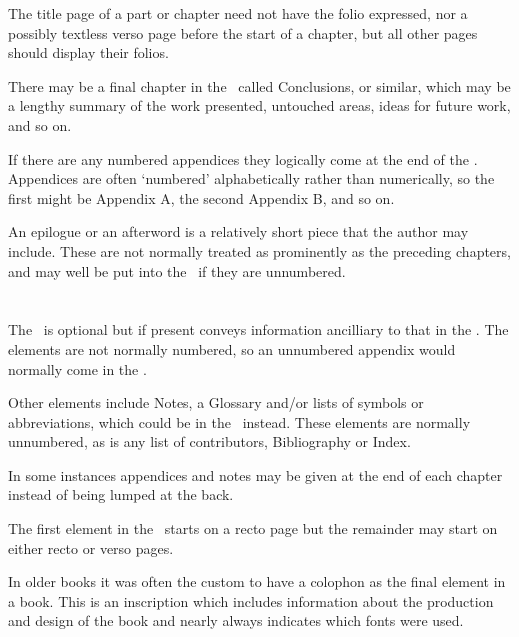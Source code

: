 \documentclass[10pt,letterpaper,extrafontsizes]{memoir}
\begin{document}
    The title page of a part
 or chapter need not have the folio expressed, nor
a possibly textless verso page before the start of a chapter, but all other 
pages should display their folios.

    There may be a final chapter in the \pixmainmatter\ called Conclusions, 
or similar, which may be a lengthy summary of the work presented, untouched
areas, ideas for future work, and so on.

    If there are any numbered appendices 
they logically come at the end of
the \pixmainmatter. Appendices are often `numbered' alphabetically rather
than numerically, so the first might be Appendix A, the second Appendix B,
and so on.

    An epilogue or an afterword is a 
relatively short piece that the author may
include. These are not normally treated as prominently as the preceding
chapters, and may well be put into the \pixbackmatter\ if they are 
unnumbered.

\section{\prBackmatter}

    The \pixbackmatter\
is optional but if present conveys information ancilliary
to that in the \pixmainmatter. The elements are not normally numbered, so an
unnumbered appendix\index{appendix} would normally come in the \pixbackmatter.

    Other elements include Notes, a Glossary
 and/or lists of symbols or 
abbreviations, which could be in the 
\pixfrontmatter\ instead. These elements 
are normally unnumbered, as is any list of contributors, 
Bibliography\index{bibliography} or Index\index{index}.

    In some instances appendices 
and notes may be given at the end of each
chapter instead of being lumped at the back.

    The first element in the \pixbackmatter\ starts on a recto page but the 
remainder may start on either recto or verso pages.

    In older books it was often the custom to have a colophon
as the final element in a book. This is an inscription which includes 
information about the production and design of the book and nearly 
always indicates which fonts\index{font} were used.
\end{document}
